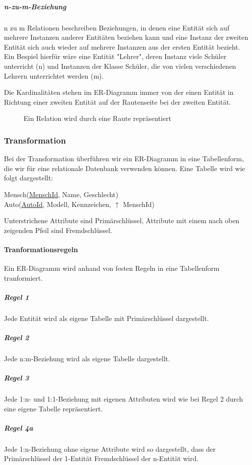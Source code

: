 \documentclass{article}
\begin{document}
	\subparagraph{n-zu-m-Beziehung}
	n zu m Relationen beschreiben Beziehungen, in denen eine Entität sich auf mehrere Instanzen anderer Entitäten beziehen kann und eine Instanz der zweiten Entität sich auch wieder auf mehrere Instanzen aus der ersten Entität bezieht. Ein Bespiel hierfür wäre eine Entität "Lehrer", deren Instanz viele Schüler unterricht (n) und Instanzen der Klasse Schüler, die von vielen verschiedenen Lehrern unterrichtet werden (m).

	Die Kardinalitäten stehen im ER-Diagramm immer von der einen Entität in Richtung einer zweiten Entität auf der Rautenseite bei der zweiten Entität.

	\begin{figure}[h!]
		\centering
		
		\caption{Ein Relation wird durch eine Raute repräsentiert}
	\end{figure}

	\subsubsection{Transformation}
	Bei der Transformation überführen wir ein ER-Diagramm in eine Tabellenform, die wir für eine relationale Datenbank verwenden können.
	Eine Tabelle wird wie folgt dargestellt:
	\begin{center}
		Mensch(\underline{MenschId}, Name, Geschlecht) \\
		Auto(\underline{AutoId}, Modell, Kennzeichen, $\uparrow$ MenschId)
	\end{center}
	Unterstrichene Attribute sind Primärschlüssel, Attribute mit einem nach oben zeigenden Pfeil sind Fremdschlüssel.

	\paragraph{Tranformationsregeln}
	Ein ER-Diagramm wird anhand von festen Regeln in eine Tabellenform tranformiert.

	\subparagraph{Regel 1}
	Jede Entität wird als eigene Tabelle mit Primärschlüssel dargestellt.

	\subparagraph{Regel 2}
	Jede n:m-Beziehung wird als eigene Tabelle dargestellt.

	\subparagraph{Regel 3}
	Jede 1:n- und 1:1-Beziehung mit eigenen Attributen wird wie bei Regel 2 durch eine eigene Tabelle repräsentiert.

	\subparagraph{Regel 4a}
	Jede 1:n-Beziehung ohne eigene Attribute wird so dargestellt, dass der Primärschlüssel der 1-Entität Fremdschlüssel der n-Entität wird.
\end{document}
